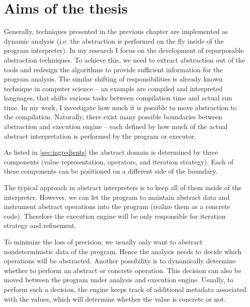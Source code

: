 \chapter{Aims of the thesis}
\label{ch:aim}


Generally, techniques presented in the previous chapter are implemented as
dynamic analysis (i.e. the abstraction is performed on the fly inside of the
program interpreter).  In my research I focus on the development of
repurposable abstraction techniques. To achieve this, we need to extract
abstraction out of the tools and redesign the algorithms to provide sufficient
information for the program analysis. The similar shifting of responsibilities
is already known technique in computer science -- an example are compiled and
interpreted languages, that shifts various tasks between compilation time and
actual run time. In my work, I investigate how much it is possible to move
abstraction to the compilation. Naturally, there exist many possible boundaries
between abstraction and execution engine -- each defined by how much of the
actual abstract interpretation is performed by the program or executor.

As listed in \autoref{sec:ingredients} the abstract domain is determined by
three components (value representation, operators, and iteration strategy).
Each of these components can be positioned on a different side of the boundary.

The typical approach in abstract interpreters is to keep all of them inside of
the interpreter. However, we can let the program to maintain abstract data and
instrument abstract operations into the program (realize them as a concrete
code). Therefore the execution engine will be only responsible for iteration
strategy and refinement.

To minimize the loss of precision, we usually only want to abstract
nondeterministic data of the program. Hence the analysis needs to decide which
operations will be abstracted. Another possibility is to dynamically determine
whether to perform an abstract or concrete operation. This decision can also be
moved between the program under analysis and execution engine. Usually, to
perform such a decision, the engine keeps track of additional metadata
associated with the values, which will determine whether the value is concrete
or not.

